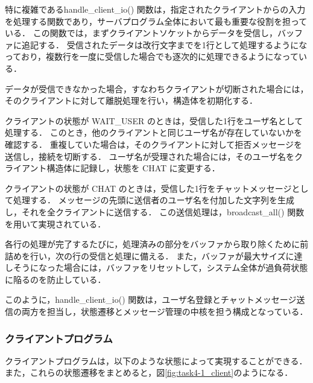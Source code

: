 \documentclass[a4j,10pt]{jarticle}
\begin{document}
特に複雑であるhandle\_client\_io() 関数は，指定されたクライアントからの入力を処理する関数であり，サーバプログラム全体において最も重要な役割を担っている．
この関数では，まずクライアントソケットからデータを受信し，バッファに追記する．
受信されたデータは改行文字までを1行として処理するようになっており，複数行を一度に受信した場合でも逐次的に処理できるようになっている．

データが受信できなかった場合，すなわちクライアントが切断された場合には，そのクライアントに対して離脱処理を行い，構造体を初期化する．

クライアントの状態が WAIT\_USER のときは，受信した1行をユーザ名として処理する．
このとき，他のクライアントと同じユーザ名が存在していないかを確認する．
重複していた場合は，そのクライアントに対して拒否メッセージを送信し，接続を切断する．
ユーザ名が受理された場合には，そのユーザ名をクライアント構造体に記録し，状態を CHAT に変更する．

クライアントの状態が CHAT のときは，受信した1行をチャットメッセージとして処理する．
メッセージの先頭に送信者のユーザ名を付加した文字列を生成し，それを全クライアントに送信する．
この送信処理は，broadcast\_all() 関数を用いて実現されている．

各行の処理が完了するたびに，処理済みの部分をバッファから取り除くために前詰めを行い，次の行の受信と処理に備える．
また，バッファが最大サイズに達しそうになった場合には，バッファをリセットして，システム全体が過負荷状態に陥るのを防止している．

このように，handle\_client\_io() 関数は，ユーザ名登録とチャットメッセージ送信の両方を担当し，状態遷移とメッセージ管理の中核を担う構成となっている．

\subsubsection{クライアントプログラム}
クライアントプログラムは，以下のような状態によって実現することができる．
また，これらの状態遷移をまとめると，図\ref{fig:task4-1_client}のようになる．
\end{document}
